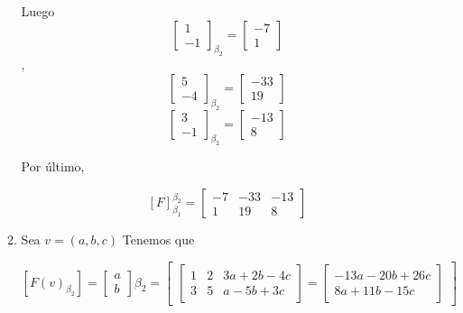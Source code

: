 \documentclass{report}
\begin{document}
\begin{enumerate}
\begin{enumerate}
            
            Luego $$\begin{bmatrix}
                1\\-1
            \end{bmatrix}_{\beta_2} = \begin{bmatrix}
                -7\\1
            \end{bmatrix}$$, $$\begin{bmatrix}
                5\\-4
            \end{bmatrix}_{\beta_2} = \begin{bmatrix}
                -33\\19
            \end{bmatrix}$$ $$\begin{bmatrix}
                3\\-1
            \end{bmatrix}_{\beta_2} = \begin{bmatrix}
                -13\\8
            \end{bmatrix}$$

            Por último,

            $$[F]_{\beta_1}^{\beta_2} = \begin{bmatrix}
                -7 & -33 & -13 \\
                1 & 19 & 8
            \end{bmatrix}$$

            \item Sea $v = (a, b, c)$ Tenemos que

            $$[F(v)_{\beta_2}] = \begin{bmatrix}
                a\\b
            \end{bmatrix}\beta_2 = \begin{bmatrix}
                \begin{bmatrix}
                1 & 2 & 3a + 2b - 4c \\
                3 & 5 & a - 5b + 3c
                \end{bmatrix} = \begin{bmatrix}
                    -13a  -20b +26c \\
                    8a + 11b -15c
                \end{bmatrix}
            \end{bmatrix}$$


\end{enumerate}
\end{enumerate}
\end{document}
